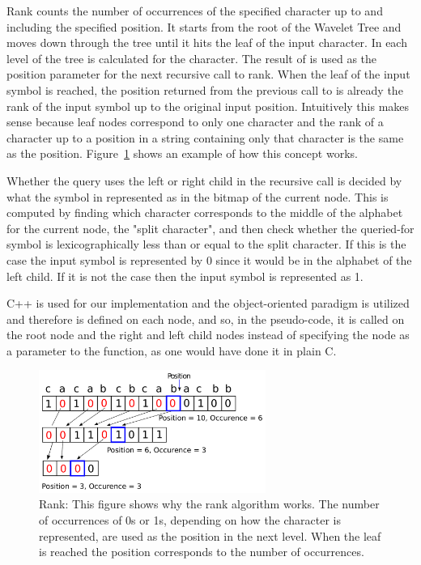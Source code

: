 Rank counts the number of occurrences of the specified character up to and including the specified position. 
It starts from the root of the Wavelet Tree and moves down through the tree until it hits the leaf of the input character.
In each level of the tree  is calculated for the character. 
The result of  is used as the position parameter for the next recursive call to rank.
When the leaf of the input symbol is reached, the position returned from the previous call to  is already the rank of the input symbol up to the original input position.
Intuitively this makes sense because leaf nodes correspond to only one character and the rank of a character up to a position in a string containing only that character is the same as the position.
Figure~\ref{fig:RankDrawing} shows an example of how this concept works.

Whether the query uses the left or right child in the recursive call is decided by what the symbol in represented as in the bitmap of the current node.
This is computed by finding which character corresponds to the middle of the alphabet for the current node, the "split character", and then check whether the queried-for symbol is lexicographically less than or equal to the split character. 
If this is the case the input symbol is represented by 0 since it would be in the alphabet of the left child.
If it is not the case then the input symbol is represented as 1.

C++ is used for our implementation and the object-oriented paradigm is utilized and therefore  is defined on each node, and so, in the pseudo-code, it is called on the root node and the right and left child nodes instead of specifying the node as a parameter to the  function, as one would have done it in plain C.

\begin{figure}
\center \includegraphics[width=0.66\textwidth]{RankDrawing}
\caption{Rank: This figure shows why the rank algorithm works. The number of occurrences of 0s or 1s, depending on how the character is represented, are used as the position in the next level. 
When the leaf is reached the position corresponds to the number of occurrences.}
\label{fig:RankDrawing}
\end{figure}


